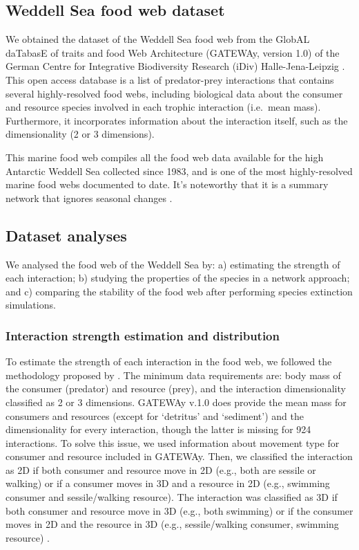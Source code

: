 \documentclass[gc, manuscript]{copernicus}
\begin{document}
\subsection{Weddell Sea food web dataset}

We obtained the dataset of the Weddell Sea food web from the GlobAL
daTabasE of traits and food Web Architecture (GATEWAy, version 1.0) of
the German Centre for Integrative Biodiversity Research (iDiv)
Halle-Jena-Leipzig \citep{Brose2018}. This open access database is a
list of predator-prey interactions that contains several highly-resolved
food webs, including biological data about the consumer and resource
species involved in each trophic interaction (i.e.~mean mass).
Furthermore, it incorporates information about the interaction itself,
such as the dimensionality (2 or 3 dimensions).

This marine food web compiles all the food web data available for the
high Antarctic Weddell Sea collected since 1983, and is one of the most
highly-resolved marine food webs documented to date. It's noteworthy
that it is a summary network that ignores seasonal changes
\citep{Jacob2011}.

\subsection{Dataset analyses}

We analysed the food web of the Weddell Sea by: a) estimating the
strength of each interaction; b) studying the properties of the species
in a network approach; and c) comparing the stability of the food web
after performing species extinction simulations.

\subsubsection{Interaction strength estimation and distribution}

To estimate the strength of each interaction in the food web, we
followed the methodology proposed by \citet{Pawar2012}. The minimum data
requirements are: body mass of the consumer (predator) and resource
(prey), and the interaction dimensionality classified as 2 or 3
dimensions. GATEWAy v.1.0 does provide the mean mass for consumers and
resources (except for `detritus' and `sediment') and the dimensionality
for every interaction, though the latter is missing for 924
interactions. To solve this issue, we used information about movement
type for consumer and resource included in GATEWAy. Then, we classified
the interaction as 2D if both consumer and resource move in 2D (e.g.,
both are sessile or walking) or if a consumer moves in 3D and a resource
in 2D (e.g., swimming consumer and sessile/walking resource). The
interaction was classified as 3D if both consumer and resource move in
3D (e.g., both swimming) or if the consumer moves in 2D and the resource
in 3D (e.g., sessile/walking consumer, swimming resource)
\citep{Pawar2012}.
\end{document}
